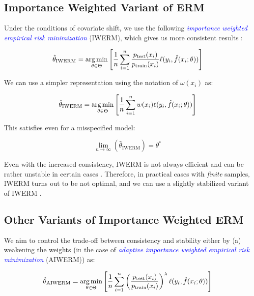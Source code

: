 \subsection{Importance Weighted Variant of ERM}\label{IWERM}
Under the conditions of covariate shift, we use the following \textcolor{blue}{\emph{importance weighted empirical risk minimization}} (IWERM), which gives us more consistent results \citep{shimodaira2000improving}:

\begin{equation}
    \hat{\theta}_{\text{IWERM}} = \operatorname*{arg\,min}_{\theta \in \Theta} \left[ \frac{1}{n}\sum_{i=1}^{n} \frac{p_{\text{test}}(x_i)}{p_{\text{train}}(x_i)} \ell(y_i, \hat{f}(x_i; \theta)) \right]
    \label{eqn:4.18}
\end{equation}

We can use a simpler representation using the notation of $\omega(x_i)$ as:

\begin{equation}
    \hat{\theta}_{\text{IWERM}} = \operatorname*{arg\,min}_{\theta \in \Theta} \left[ \frac{1}{n}\sum_{i=1}^{n} w(x_i) \ell(y_i, \hat{f}(x_i; \theta)) \right]
    \label{eqn:4.19}
\end{equation}

This satisfies even for a misspecified model:

\begin{equation}
    \lim_{n \to \infty} (\hat{\theta}_{\text{IWERM}}) = \theta^*
    \label{eqn:4.20}
\end{equation}

Even with the increased consistency, IWERM is not always efficient and can be rather unstable in certain cases \citep{shimodaira2000improving}. Therefore, in practical cases with \emph{finite} samples, IWERM turns out to be not optimal, and we can use a slightly stabilized variant of IWERM \citep{sugiyama2000covariate}.\\

\subsection{Other Variants of Importance Weighted ERM}
We aim to control the trade-off between consistency and stability either by (a) weakening the weights (in the case of \textcolor{blue}{\emph{adaptive importance weighted empirical risk minimization}} (AIWERM)) as:

\begin{equation}
    \hat{\theta}_{\text{AIWERM}} = \operatorname*{arg\,min}_{\theta \in \Theta} \left[ \frac{1}{n}\sum_{i=1}^{n} \left( \frac{p_{\text{test}}(x_i)}{p_{\text{train}}(x_i)} \right)^{\lambda} \ell(y_i, \hat{f}(x_i; \theta)) \right]
    \label{eqn:4.21}
\end{equation}

